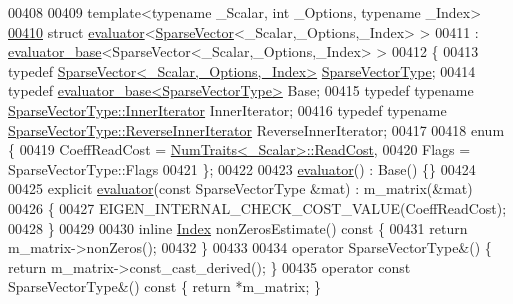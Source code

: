 \begin{DoxyCode}
00408 
00409 \textcolor{keyword}{template}<\textcolor{keyword}{typename} \_Scalar, \textcolor{keywordtype}{int} \_Options, \textcolor{keyword}{typename} \_Index>
\hyperlink{struct_eigen_1_1internal_1_1evaluator_3_01_sparse_vector_3_01___scalar_00_01___options_00_01___index_01_4_01_4}{00410} \textcolor{keyword}{struct }\hyperlink{struct_eigen_1_1internal_1_1evaluator}{evaluator}<\hyperlink{group___sparse_core___module_class_eigen_1_1_sparse_vector}{SparseVector}<\_Scalar,\_Options,\_Index> >
00411   : \hyperlink{struct_eigen_1_1internal_1_1evaluator__base}{evaluator\_base}<SparseVector<\_Scalar,\_Options,\_Index> >
00412 \{
00413   \textcolor{keyword}{typedef} \hyperlink{group___sparse_core___module_class_eigen_1_1_sparse_vector}{SparseVector<\_Scalar,\_Options,\_Index>} 
      \hyperlink{group___sparse_core___module_class_eigen_1_1_sparse_vector}{SparseVectorType};
00414   \textcolor{keyword}{typedef} \hyperlink{struct_eigen_1_1internal_1_1evaluator__base}{evaluator\_base<SparseVectorType>} Base;
00415   \textcolor{keyword}{typedef} \textcolor{keyword}{typename} \hyperlink{class_eigen_1_1_sparse_compressed_base_1_1_inner_iterator}{SparseVectorType::InnerIterator} InnerIterator;
00416   \textcolor{keyword}{typedef} \textcolor{keyword}{typename} \hyperlink{class_eigen_1_1_sparse_compressed_base_1_1_reverse_inner_iterator}{SparseVectorType::ReverseInnerIterator} 
      ReverseInnerIterator;
00417   
00418   \textcolor{keyword}{enum} \{
00419     CoeffReadCost = \hyperlink{group___core___module_struct_eigen_1_1_num_traits}{NumTraits<\_Scalar>::ReadCost},
00420     Flags = SparseVectorType::Flags
00421   \};
00422 
00423   \hyperlink{struct_eigen_1_1internal_1_1evaluator}{evaluator}() : Base() \{\}
00424   
00425   \textcolor{keyword}{explicit} \hyperlink{struct_eigen_1_1internal_1_1evaluator}{evaluator}(\textcolor{keyword}{const} SparseVectorType &mat) : m\_matrix(&mat)
00426   \{
00427     EIGEN\_INTERNAL\_CHECK\_COST\_VALUE(CoeffReadCost);
00428   \}
00429   
00430   \textcolor{keyword}{inline} \hyperlink{namespace_eigen_a62e77e0933482dafde8fe197d9a2cfde}{Index} nonZerosEstimate()\textcolor{keyword}{ const }\{
00431     \textcolor{keywordflow}{return} m\_matrix->nonZeros();
00432   \}
00433   
00434   \textcolor{keyword}{operator} SparseVectorType&() \{ \textcolor{keywordflow}{return} m\_matrix->const\_cast\_derived(); \}
00435   \textcolor{keyword}{operator} \textcolor{keyword}{const} SparseVectorType&() \textcolor{keyword}{const} \{ \textcolor{keywordflow}{return} *m\_matrix; \}

\end{DoxyCode}
